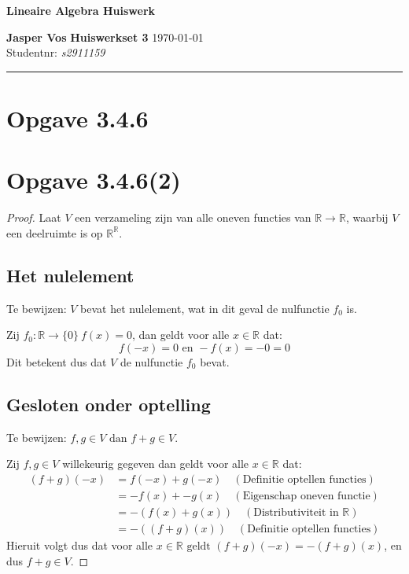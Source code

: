 \documentclass{article}
\newcommand{\R}{\mathbb{R}}
\newcommand{\en}{\text{ en }}
\newcommand{\dan}{\text{ dan }}
\newcommand{\geldt}{\text{ geldt }}
\begin{document}
{\Large \textbf{Lineaire Algebra Huiswerk}}

\bigskip

\textbf{Jasper Vos} \hfill \textbf{Huiswerkset 3} \hfill \today \\
Studentnr: \emph{s2911159}

\rule{\textwidth}{2pt}

\bigskip

\section*{Opgave 3.4.6}

\section*{Opgave 3.4.6(2)}
\begin{proof}
    Laat $V$ een verzameling zijn van
    alle oneven functies van $\R \rightarrow \R$,
    waarbij $V$ een deelruimte is op $\R^{\R}$.

    \subsection*{Het nulelement}
    Te bewijzen: $V$ bevat het nulelement,
    wat in dit geval de nulfunctie $f_0$ is.

    Zij $f_0:\R \rightarrow \{0\} \ f(x) = 0$, dan
    geldt voor alle $x \in \R$ dat:
    \[f(-x) = 0 \en -f(x) = -0 = 0\]
    Dit betekent dus dat $V$ de nulfunctie $f_0$ bevat.

    \subsection*{Gesloten onder optelling}
    Te bewijzen: $f, g \in V \dan f + g \in V$.

    Zij $f, g \in V$ willekeurig gegeven dan
    geldt voor alle $x \in \R$ dat:
    \begin{align*}
        (f + g)(-x) & = f(-x) + g(-x)  \quad (\text{Definitie optellen functies}) \\
                    & = -f(x) + -g(x) \quad (\text{Eigenschap oneven functie})    \\
                    & = -(f(x) + g(x)) \quad (\text{Distributiviteit in $\R$})    \\
                    & = -((f + g)(x)) \quad (\text{Definitie optellen functies})
    \end{align*}
    Hieruit volgt dus dat voor alle
    $x \in \R \geldt
        (f + g)(-x) = -(f + g)(x)$, en dus
    $f + g \in V$.


\end{proof}
\end{document}
